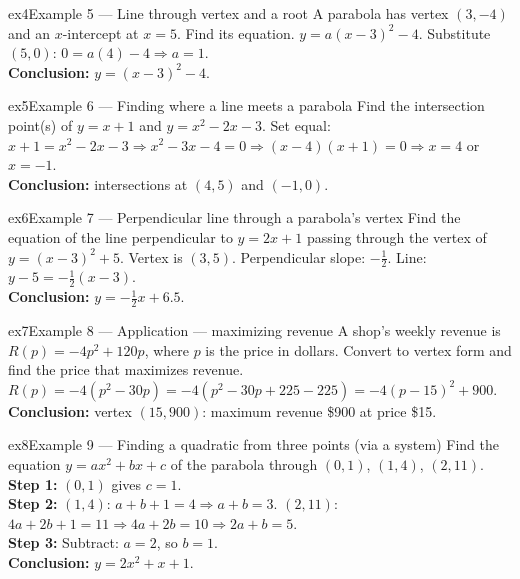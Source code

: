 \documentclass[11pt]{article}
\begin{document}
\begin{example}{ex4}{Example 5 --- Line through vertex and a root}
A parabola has vertex $(3,-4)$ and an $x$-intercept at $x=5$. Find its equation.\soln
$y=a(x-3)^2-4$. Substitute $(5,0)$: $0=a(4)-4\Rightarrow a=1$.\\[3pt]\textbf{Conclusion:} $y=(x-3)^2-4$.
\end{example}

\begin{example}{ex5}{Example 6 --- Finding where a line meets a parabola}
Find the intersection point(s) of $y=x+1$ and $y=x^2-2x-3$.\soln
Set equal: $x+1=x^2-2x-3\Rightarrow x^2-3x-4=0\Rightarrow(x-4)(x+1)=0\Rightarrow x=4$ or $x=-1$.\\[3pt]\textbf{Conclusion:} intersections at $(4,5)$ and $(-1,0)$.
\end{example}

\begin{example}{ex6}{Example 7 --- Perpendicular line through a parabola's vertex}
Find the equation of the line perpendicular to $y=2x+1$ passing through the vertex of $y=(x-3)^2+5$.\soln
Vertex is $(3,5)$. Perpendicular slope: $-\tfrac12$. Line: $y-5=-\tfrac12(x-3)$.\\[3pt]\textbf{Conclusion:} $y=-\tfrac12x+6.5$.
\end{example}

\begin{example}{ex7}{Example 8 --- Application --- maximizing revenue}
A shop's weekly revenue is $R(p)=-4p^2+120p$, where $p$ is the price in dollars. Convert to vertex form and find the price that maximizes revenue.\soln
$R(p)=-4(p^2-30p)=-4(p^2-30p+225-225)=-4(p-15)^2+900$.\\[3pt]\textbf{Conclusion:} vertex $(15,900)$: maximum revenue \$900 at price \$15.
\end{example}

\begin{example}{ex8}{Example 9 --- Finding a quadratic from three points (via a system)}
Find the equation $y=ax^2+bx+c$ of the parabola through $(0,1)$, $(1,4)$, $(2,11)$.\soln
\textbf{Step 1:} $(0,1)$ gives $c=1$.\\[3pt]
\textbf{Step 2:} $(1,4)$: $a+b+1=4\Rightarrow a+b=3$. $(2,11)$: $4a+2b+1=11\Rightarrow4a+2b=10\Rightarrow2a+b=5$.\\[3pt]
\textbf{Step 3:} Subtract: $a=2$, so $b=1$.\\[3pt]\textbf{Conclusion:} $y=2x^2+x+1$.
\end{example}
\end{document}
